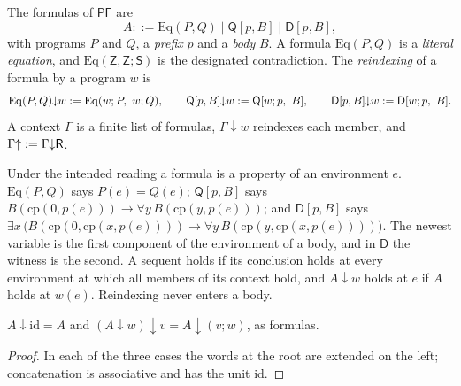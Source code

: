 \begin{definition}
\label{base:def:pf-formulas}
The formulas of $\mathsf{PF}$ are
\[
 A::=\mathrm{Eq}(P,Q)\mid\mathsf Q[p,B]\mid\mathsf D[p,B],
\]
with programs $P$ and $Q$, a \emph{prefix} $p$ and a \emph{body} $B$.  A
formula $\mathrm{Eq}(P,Q)$ is a \emph{literal equation}, and
$\mathrm{Eq}(\mathsf Z,\mathsf Z;\mathsf S)$ is the designated
contradiction.  The \emph{reindexing} of a formula by a program $w$ is
\[
 \mathrm{Eq}(P,Q){\downarrow}w\defeq\mathrm{Eq}(w;P,\ w;Q),\qquad
 \mathsf Q[p,B]{\downarrow}w\defeq\mathsf Q[w;p,\ B],\qquad
 \mathsf D[p,B]{\downarrow}w\defeq\mathsf D[w;p,\ B].
\]
A context $\Gamma$ is a finite list of formulas, $\Gamma{\downarrow}w$
reindexes each member, and $\Gamma{\uparrow}\mathrel{:=}\Gamma{\downarrow}\mathsf R$.
\end{definition}

Under the intended reading a formula is a property of an environment $e$.
$\mathrm{Eq}(P,Q)$ says $P(e)=Q(e)$; $\mathsf Q[p,B]$ says
$B(\mathrm{cp}(0,p(e)))\to\forall y\,B(\mathrm{cp}(y,p(e)))$; and
$\mathsf D[p,B]$ says
$\exists x\,\bigl(B(\mathrm{cp}(0,\mathrm{cp}(x,p(e))))\to\forall y\,
B(\mathrm{cp}(y,\mathrm{cp}(x,p(e))))\bigr)$.  The newest variable is the
first component of the environment of a body, and in $\mathsf D$ the
witness is the second.  A sequent holds if its conclusion holds at every
environment at which all members of its context hold, and $A{\downarrow}w$
holds at $e$ if $A$ holds at $w(e)$.  Reindexing never enters a body.

\begin{lemma}
\label{base:lem:pf-root}
$A{\downarrow}\mathrm{id}=A$ and
$(A{\downarrow}w){\downarrow}v=A{\downarrow}(v;w)$, as formulas.
\end{lemma}

\begin{proof}
In each of the three cases the words at the root are extended on the left;
concatenation is associative and has the unit $\mathrm{id}$.
\end{proof}

